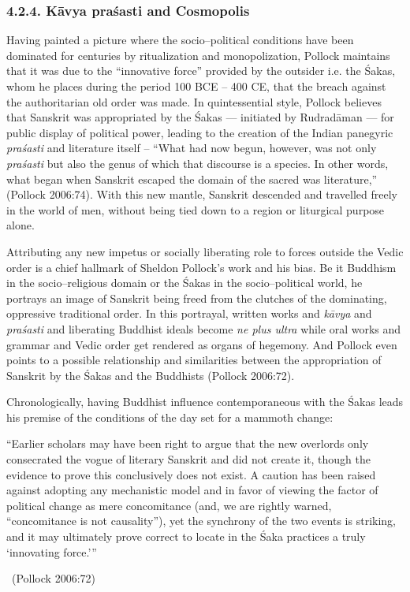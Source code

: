 \subsubsection*{4.2.4. Kāvya praśasti and Cosmopolis}

Having painted a picture where the socio–political conditions have been dominated for centuries by ritualization and monopolization, Pollock maintains that it was due to the “innovative force” provided by the outsider i.e. the Śakas, whom he places during the period 100 BCE – 400 CE, that the breach against the authoritarian old order was made. In quintessential style, Pollock believes that Sanskrit was appropriated by the Śakas — initiated by Rudradāman — for public display of political power, leading to the creation of the Indian panegyric \textit{praśasti} and literature itself – “What had now begun, however, was not only \textit{praśasti} but also the genus of which that discourse is a species. In other words, what began when Sanskrit escaped the domain of the sacred was literature,” (Pollock 2006:74). With this new mantle, Sanskrit descended and travelled freely in the world of men, without being tied down to a region or liturgical purpose alone.

Attributing any new impetus or socially liberating role to forces outside the Vedic order is a chief hallmark of Sheldon Pollock’s work and his bias. Be it Buddhism in the socio–religious domain or the Śakas in the socio–political world, he portrays an image of Sanskrit being freed from the clutches of the dominating, oppressive traditional order. In this portrayal, written works and \textit{kāvya} and \textit{praśasti} and liberating Buddhist ideals become \textit{ne plus ultra} while oral works and grammar and Vedic order get rendered as organs of hegemony. And Pollock even points to a possible relationship and similarities between the appropriation of Sanskrit by the Śakas and the Buddhists (Pollock 2006:72).

Chronologically, having Buddhist influence contemporaneous with the Śakas leads his premise of the conditions of the day set for a mammoth change:

\begin{myquote}
“Earlier scholars may have been right to argue that the new overlords only consecrated the vogue of literary Sanskrit and did not create it, though the evidence to prove this conclusively does not exist. A caution has been raised against adopting any mechanistic model and in favor of viewing the factor of political change as mere concomitance (and, we are rightly warned, “concomitance is not causality”), yet the synchrony of the two events is striking, and it may ultimately prove correct to locate in the Śaka practices a truly ‘innovating force.’” 

~\hfill (Pollock 2006:72)
\end{myquote}

